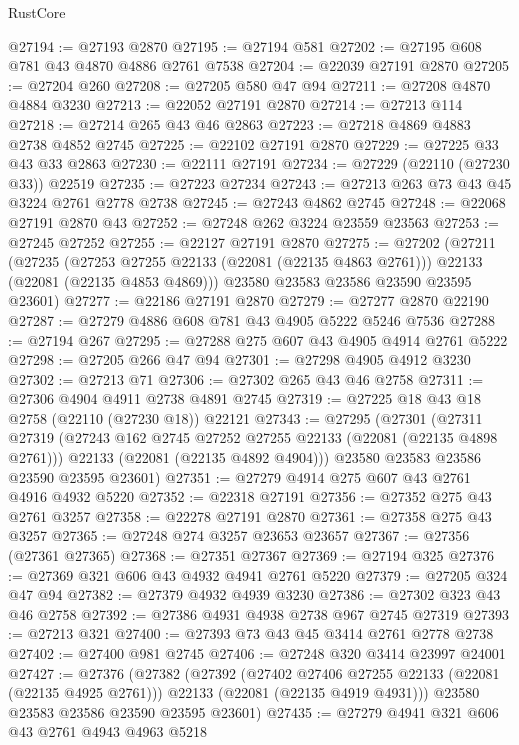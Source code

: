 \begin{lexlean}{RustCore}
\begin{coremodule}
@27194 := @27193 @2870
@27195 := @27194 @581
@27202 := @27195 @608 @781 @43 @4870 @4886 @2761 @7538
@27204 := @22039 @27191 @2870
@27205 := @27204 @260
@27208 := @27205 @580 @47 @94
@27211 := @27208 @4870 @4884 @3230
@27213 := @22052 @27191 @2870
@27214 := @27213 @114
@27218 := @27214 @265 @43 @46 @2863
@27223 := @27218 @4869 @4883 @2738 @4852 @2745
@27225 := @22102 @27191 @2870
@27229 := @27225 @33 @43 @33 @2863
@27230 := @22111 @27191
@27234 := @27229 (@22110 (@27230 @33)) @22519
@27235 := @27223 @27234
@27243 := @27213 @263 @73 @43 @45 @3224 @2761 @2778 @2738
@27245 := @27243 @4862 @2745
@27248 := @22068 @27191 @2870 @43
@27252 := @27248 @262 @3224 @23559 @23563
@27253 := @27245 @27252
@27255 := @22127 @27191 @2870
@27275 := @27202
    (@27211
      (@27235
        (@27253 @27255 @22133 (@22081 (@22135 @4863 @2761)))
        @22133
        (@22081 (@22135 @4853 @4869)))
      @23580
      @23583
      @23586
      @23590
      @23595
      @23601)
@27277 := @22186 @27191 @2870
@27279 := @27277 @2870 @22190
@27287 := @27279 @4886 @608 @781 @43 @4905 @5222 @5246 @7536
@27288 := @27194 @267
@27295 := @27288 @275 @607 @43 @4905 @4914 @2761 @5222
@27298 := @27205 @266 @47 @94
@27301 := @27298 @4905 @4912 @3230
@27302 := @27213 @71
@27306 := @27302 @265 @43 @46 @2758
@27311 := @27306 @4904 @4911 @2738 @4891 @2745
@27319 := @27225 @18 @43 @18 @2758 (@22110 (@27230 @18)) @22121
@27343 := @27295
    (@27301
      (@27311
        @27319
        (@27243 @162 @2745 @27252 @27255 @22133 (@22081 (@22135 @4898 @2761)))
        @22133
        (@22081 (@22135 @4892 @4904)))
      @23580
      @23583
      @23586
      @23590
      @23595
      @23601)
@27351 := @27279 @4914 @275 @607 @43 @2761 @4916 @4932 @5220
@27352 := @22318 @27191
@27356 := @27352 @275 @43 @2761 @3257
@27358 := @22278 @27191 @2870
@27361 := @27358 @275 @43 @3257
@27365 := @27248 @274 @3257 @23653 @23657
@27367 := @27356 (@27361 @27365)
@27368 := @27351 @27367
@27369 := @27194 @325
@27376 := @27369 @321 @606 @43 @4932 @4941 @2761 @5220
@27379 := @27205 @324 @47 @94
@27382 := @27379 @4932 @4939 @3230
@27386 := @27302 @323 @43 @46 @2758
@27392 := @27386 @4931 @4938 @2738 @967 @2745 @27319
@27393 := @27213 @321
@27400 := @27393 @73 @43 @45 @3414 @2761 @2778 @2738
@27402 := @27400 @981 @2745
@27406 := @27248 @320 @3414 @23997 @24001
@27427 := @27376
    (@27382
      (@27392
        (@27402 @27406 @27255 @22133 (@22081 (@22135 @4925 @2761)))
        @22133
        (@22081 (@22135 @4919 @4931)))
      @23580
      @23583
      @23586
      @23590
      @23595
      @23601)
@27435 := @27279 @4941 @321 @606 @43 @2761 @4943 @4963 @5218

\end{coremodule}
\end{lexlean}
